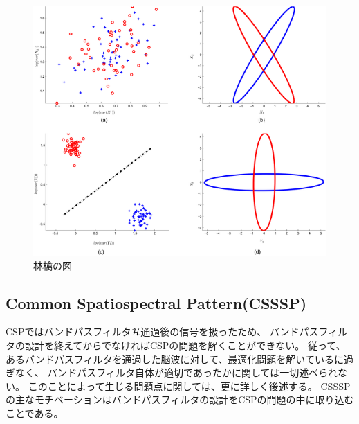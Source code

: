 \begin{figure}
    \centering
    \includegraphics[width=12cm]{images/apple.png}
    \caption{林檎の図}
\end{figure}
  

\subsection{Common Spatiospectral Pattern(CSSSP)}
CSPではバンドパスフィルタ\(\cal H\)通過後の信号を扱ったため、
バンドパスフィルタの設計を終えてからでなければCSPの問題を解くことができない。
従って、あるバンドパスフィルタを通過した脳波に対して、最適化問題を解いているに過ぎなく、
バンドパスフィルタ自体が適切であったかに関しては一切述べられない。
このことによって生じる問題点に関しては、更に詳しく後述する。
CSSSPの主なモチベーションはバンドパスフィルタの設計をCSPの問題の中に取り込むことである\cite{csssp}。

